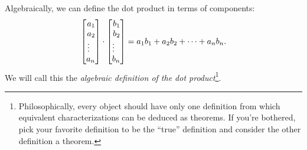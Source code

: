 \begin{center}
	\newcommand{\tikzAngleOfLine}{\tikz@AngleOfLine}                               
	  \def\tikz@AngleOfLine(#1)(#2)#3{%
	  \pgfmathanglebetweenpoints{%
	    \pgfpointanchor{#1}{center}}{%
	    \pgfpointanchor{#2}{center}}                                               
	  \pgfmathsetmacro{#3}{\pgfmathresult}%
	  }                                                                            
	\newcommand{\tikzMarkAngle}[3]{                                                
	\tikzAngleOfLine#1#2{\AngleStart}                                              
	\tikzAngleOfLine#1#3{\AngleEnd}                                                
	\draw #1+(\AngleStart:0.35cm) arc (\AngleStart:\AngleEnd:0.35cm);              
	} 
	\usetikzlibrary{patterns,decorations.pathreplacing}
	\hspace{1cm}
\end{center}

Algebraically, we can define the dot product in terms of components:
\[
	\mat{a_1\\a_2\\\vdots\,\,\,\, \\a_n}\cdot \mat{b_1\\b_2\\\vdots\,\,\,\,\\b_n}
	=a_1b_1+a_2b_2+\cdots+a_nb_n.
\]
We will call this the \emph{algebraic definition of the dot product}\footnote{
	Philosophically,
every object should have only one definition from which equivalent characterizations
can be deduced as theorems.  If you're bothered, pick your favorite definition
to be the ``true'' definition and consider the other definition a theorem.
}.

